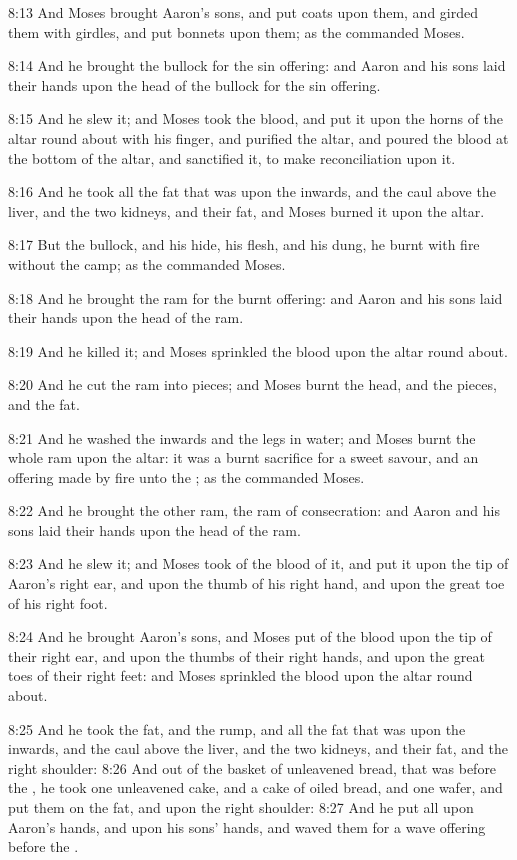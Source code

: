 8:13 And Moses brought Aaron's sons, and put coats upon them, and girded them with girdles, and put bonnets upon them; as the \LORD commanded Moses.

8:14 And he brought the bullock for the sin offering: and Aaron and his sons laid their hands upon the head of the bullock for the sin offering.

8:15 And he slew it; and Moses took the blood, and put it upon the horns of the altar round about with his finger, and purified the altar, and poured the blood at the bottom of the altar, and sanctified it, to make reconciliation upon it.

8:16 And he took all the fat that was upon the inwards, and the caul above the liver, and the two kidneys, and their fat, and Moses burned it upon the altar.

8:17 But the bullock, and his hide, his flesh, and his dung, he burnt with fire without the camp; as the \LORD commanded Moses.

8:18 And he brought the ram for the burnt offering: and Aaron and his sons laid their hands upon the head of the ram.

8:19 And he killed it; and Moses sprinkled the blood upon the altar round about.

8:20 And he cut the ram into pieces; and Moses burnt the head, and the pieces, and the fat.

8:21 And he washed the inwards and the legs in water; and Moses burnt the whole ram upon the altar: it was a burnt sacrifice for a sweet savour, and an offering made by fire unto the \LORD; as the \LORD commanded Moses.

8:22 And he brought the other ram, the ram of consecration: and Aaron and his sons laid their hands upon the head of the ram.

8:23 And he slew it; and Moses took of the blood of it, and put it upon the tip of Aaron's right ear, and upon the thumb of his right hand, and upon the great toe of his right foot.

8:24 And he brought Aaron's sons, and Moses put of the blood upon the tip of their right ear, and upon the thumbs of their right hands, and upon the great toes of their right feet: and Moses sprinkled the blood upon the altar round about.

8:25 And he took the fat, and the rump, and all the fat that was upon the inwards, and the caul above the liver, and the two kidneys, and their fat, and the right shoulder: 8:26 And out of the basket of unleavened bread, that was before the \LORD, he took one unleavened cake, and a cake of oiled bread, and one wafer, and put them on the fat, and upon the right shoulder: 8:27 And he put all upon Aaron's hands, and upon his sons' hands, and waved them for a wave offering before the \LORD.

